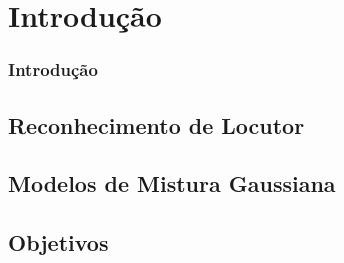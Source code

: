 \section{Introdução}
\label{sec:intro}

\contentscurrent

\begin{frame}
\frametitle{Introdução}
\end{frame}

\subsection{Reconhecimento de Locutor}

\subsection{Modelos de Mistura Gaussiana}

\subsection{Objetivos}